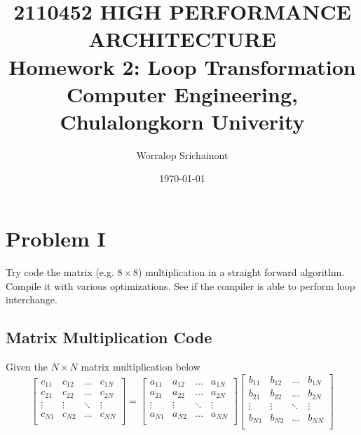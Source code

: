 \documentclass[12pt, a4paper]{article}
\title {
	\textbf{2110452 HIGH PERFORMANCE ARCHITECTURE} \\
    \vspace{1em}
	\Large{\textbf{Homework 2: Loop Transformation}} \\
    \vspace{0.5em}
    \large{Computer Engineering, Chulalongkorn Univerity}
}
\author{Worralop Srichainont}
\date{\today}
\begin{document}
    \maketitle
    \thispagestyle{empty}
    \clearpage

    \tableofcontents
    \thispagestyle{empty}
    \clearpage


    \section{Problem I}
        Try code the matrix (e.g. $8 \times 8$) multiplication in a straight forward algorithm.
        Compile it with various optimizations.
        See if the compiler is able to perform loop interchange.

        \subsection{Matrix Multiplication Code}
            \noindent Given the $N \times N$ matrix multiplication below
            $$
                \begin{bmatrix}
                    c_{11} & c_{12} & \dots & c_{1N} \\
                    c_{21} & c_{22} & \dots & c_{2N} \\
                    \vdots & \vdots & \ddots & \vdots \\
                    c_{N1} & c_{N2} & \dots & c_{NN} \\
                \end{bmatrix}
                =
                \begin{bmatrix}
                    a_{11} & a_{12} & \dots & a_{1N} \\
                    a_{21} & a_{22} & \dots & a_{2N} \\
                    \vdots & \vdots & \ddots & \vdots \\
                    a_{N1} & a_{N2} & \dots & a_{NN} \\
                \end{bmatrix}
                \begin{bmatrix}
                    b_{11} & b_{12} & \dots & b_{1N} \\
                    b_{21} & b_{22} & \dots & b_{2N} \\
                    \vdots & \vdots & \ddots & \vdots \\
                    b_{N1} & b_{N2} & \dots & b_{NN} \\
                \end{bmatrix}
            $$
\end{document}
